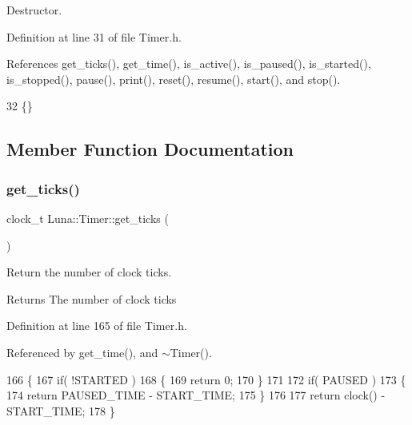 Destructor. 



Definition at line 31 of file Timer.\+h.



References get\+\_\+ticks(), get\+\_\+time(), is\+\_\+active(), is\+\_\+paused(), is\+\_\+started(), is\+\_\+stopped(), pause(), print(), reset(), resume(), start(), and stop().


\begin{DoxyCode}
32         \{\}
\end{DoxyCode}


\subsection{Member Function Documentation}
\mbox{\label{classLuna_1_1Timer_a7b9ca4a1299e21bb5690aa960612ae9e}} 
\subsubsection{\texorpdfstring{get\+\_\+ticks()}{get\_ticks()}}
{\footnotesize\ttfamily clock\+\_\+t Luna\+::\+Timer\+::get\+\_\+ticks (\begin{DoxyParamCaption}{ }\end{DoxyParamCaption})\hspace{0.3cm}{\ttfamily [inline]}}



Return the number of clock ticks. 

\begin{DoxyReturn}{Returns}
The number of clock ticks 
\end{DoxyReturn}


Definition at line 165 of file Timer.\+h.



Referenced by get\+\_\+time(), and $\sim$\+Timer().


\begin{DoxyCode}
166     \{
167         \textcolor{keywordflow}{if}( !STARTED )
168         \{
169             \textcolor{keywordflow}{return} 0;
170         \}
171 
172         \textcolor{keywordflow}{if}( PAUSED )
173         \{
174             \textcolor{keywordflow}{return} PAUSED\_TIME - START\_TIME;
175         \}
176 
177         \textcolor{keywordflow}{return} clock() - START\_TIME;
178     \}
\end{DoxyCode}
\mbox{\label{classLuna_1_1Timer_ac8b59a9f3d149ec56156af6f74a6d1a9}} 
